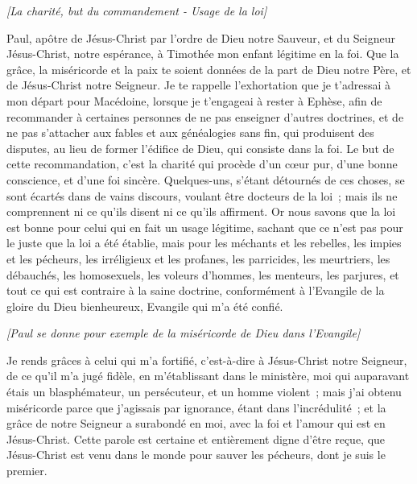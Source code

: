 \BFont
\begin{multicols}{2}
\begin{center}
\textit{[La charité, but du commandement - Usage de la loi]}
\end{center}
\VerseOne{}Paul, apôtre de Jésus-Christ par l’ordre de Dieu notre Sauveur, et du Seigneur Jésus-Christ, notre espérance,
à Timothée mon enfant légitime en la foi. Que la grâce, la miséricorde et la paix te soient données de la part de Dieu notre Père, et de Jésus-Christ notre Seigneur.
Je te rappelle l’exhortation que je t’adressai à mon départ pour Macédoine, lorsque je t’engageai à rester à Ephèse, afin de recommander à certaines personnes de ne pas enseigner d’autres doctrines,
et de ne pas s’attacher aux fables et aux généalogies sans fin, qui produisent des disputes, au lieu de former l’édifice de Dieu, qui consiste dans la foi.
Le but de cette recommandation, c’est la charité qui procède d'un cœur pur, d'une bonne conscience, et d'une foi sincère.
Quelques-uns, s'étant détournés de ces choses, se sont écartés dans de vains discours,
voulant être docteurs de la loi ; mais ils ne comprennent ni ce qu’ils disent ni ce qu’ils affirment.
Or nous savons que la loi est bonne pour celui qui en fait un usage légitime,
sachant que ce n’est pas pour le juste que la loi a été établie, mais pour les méchants et les rebelles, les impies et les pécheurs, les irréligieux et les profanes, les parricides, les meurtriers,
les débauchés, les homosexuels, les voleurs d’hommes, les menteurs, les parjures, et tout ce qui est contraire à la saine doctrine,
conformément à l'Evangile de la gloire du Dieu bienheureux, Evangile qui m'a été confié.
\begin{center}
\textit{[Paul se donne pour exemple de la miséricorde de Dieu dans l'Evangile]}
\end{center}
\PPE{}
Je rends grâces à celui qui m'a fortifié, c'est-à-dire à Jésus-Christ notre Seigneur, de ce qu'il m'a jugé fidèle, en m’établissant dans le ministère,
moi qui auparavant étais un blasphémateur, un persécuteur, et un homme violent ; mais j'ai obtenu miséricorde parce que j’agissais par ignorance, étant dans l’incrédulité ;
et la grâce de notre Seigneur a surabondé en moi, avec la foi et l'amour qui est en Jésus-Christ.
Cette parole est certaine et entièrement digne d'être reçue, que Jésus-Christ est venu dans le monde pour sauver les pécheurs, dont je suis le premier.

\end{multicols}
